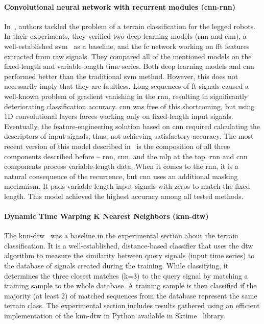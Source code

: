\documentclass[a4paper, 10pt, twoside]{report}
\begin{document}
\paragraph{Convolutional neural network with recurrent modules (\acrshort{cnn}-\acrshort{rnn})}
In~\cite{bednarek2019icra}, authors tackled the problem of a terrain classification for the legged robots. In their experiments, they verified two deep learning models (\acrshort{rnn} and \acrshort{cnn}), a well-established \acrshort{svm}~\cite{SVM} as a baseline, and the \acrshort{fc} network working on \acrfull{fft} features extracted from raw signals. They compared all of the mentioned models on the fixed-length and variable-length time series. Both deep learning models and \acrshort{cnn} performed better than the traditional \acrshort{svm} method. However, this does not necessarily imply that they are faultless. Long sequences of \acrshort{ft} signals caused a well-known problem of gradient vanishing in the \acrshort{rnn}, resulting in significantly deteriorating classification accuracy. \acrshort{cnn} was free of this shortcoming, but using 1D convolutional layers forces working only on fixed-length input signals. Eventually, the feature-engineering solution based on \acrshort{cnn} required calculating the descriptors of input signals, thus, not achieving satisfactory accuracy. The most recent version of this model described in~\cite{KubaRNN} is the composition of all three components described before -- \acrshort{rnn}, \acrshort{cnn}, and the \acrshort{mlp} at the top. \acrshort{rnn} and \acrshort{cnn} components process variable-length data. When it comes to the \acrshort{rnn}, it is a natural consequence of the recurrence, but \acrshort{cnn} uses an additional masking mechanism. It pads variable-length input signals with zeros to match the fixed length. This model achieved the highest accuracy among all tested methods. 

\paragraph{Dynamic Time Warping K Nearest Neighbors (\acrshort{knn}-\acrshort{dtw})} The \acrshort{knn}-\acrshort{dtw}~\cite{dtw_is_best} was a baseline in the experimental section about the terrain classification. It is a well-established, distance-based classifier that uses the \acrshort{dtw} algorithm to measure the similarity between query signals (input time series) to the database of signals created during the training. While classifying, it determines the three closest matches (k=3) to the query signal by matching a training sample to the whole database. A training sample is then classified if the majority (at least 2) of matched sequences from the database represent the same terrain class. The experimental section includes results gathered using an efficient implementation of the \acrshort{knn}-\acrshort{dtw} in Python available in Sktime~\cite{Loning2019} library.
\end{document}
